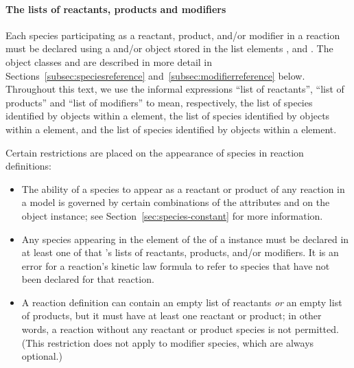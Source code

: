 \paragraph{The lists of reactants, products and modifiers}

Each species participating as a reactant, product, and/or modifier
in a reaction must be declared using a \SpeciesReference and/or
\ModifierSpeciesReference object stored in the list elements
,  and
.  The object classes \SpeciesReference and
\ModifierSpeciesReference are described in more detail in
Sections~\ref{subsec:speciesreference}
and~\ref{subsec:modifierreference} below.  Throughout this text,
we use the informal expressions ``list of reactants'', ``list of
products'' and ``list of modifiers'' to mean, respectively, the
list of species identified by \SpeciesReference objects within a
\Reaction {} element, the list of species
identified by \SpeciesReference objects within a \Reaction
{} element, and the list of species identified
by \ModifierSpeciesReference objects within a \Reaction
{} element.

Certain restrictions are placed on the appearance of species in
reaction definitions:
\begin{itemize}
  
\item The ability of a species to appear as a reactant or product
  of any reaction in a model is governed by certain combinations
  of the attributes  and 
  on the \Species object instance; see
  Section~\ref{sec:species-constant} for more information.
  
\item Any species appearing in the  element of the
   of a \Reaction instance must be declared in
  at least one of that \Reaction's lists of reactants, products,
  and/or modifiers.  It is an error for a reaction's kinetic law
  formula to refer to species that have not been declared for that
  reaction.
  
\item A reaction definition can contain an empty list of reactants
  \emph{or} an empty list of products, but it must have at least
  one reactant or product; in other words, a reaction without any
  reactant or product species is not permitted.  (This restriction
  does not apply to modifier species, which are always optional.)

\end{itemize}


